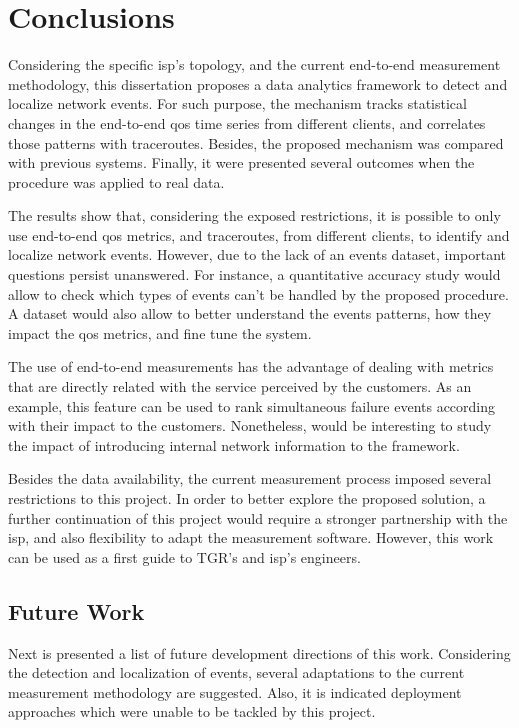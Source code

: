 \chapter{Conclusions}
\label{chap:conclusion}

Considering the specific \gls*{isp}'s topology, and the current end-to-end measurement
methodology, this dissertation proposes a data analytics framework to
detect and localize network events.
For such purpose, the mechanism tracks
statistical changes in the end-to-end \gls*{qos} time series from different clients,
and correlates those patterns with traceroutes.
Besides, the proposed mechanism was compared with previous systems.
Finally, it were presented several outcomes when the procedure was applied to
real data.

The results show that, considering the exposed restrictions,
it is possible to only use end-to-end \gls*{qos} metrics, and traceroutes, from
different clients, to identify and localize network events.
However, due to the lack of an events dataset, important
questions persist unanswered.
For instance, a quantitative accuracy study
would allow to check which types of events can't be handled by the
proposed procedure.
A dataset would also allow to better understand the events
patterns, how they impact the \gls*{qos} metrics, and fine tune the system.

The use of end-to-end measurements has the advantage of dealing with
metrics that are directly related with the service perceived by the customers.
As an example, this feature can be used to rank simultaneous failure events
according with their impact to the customers.
Nonetheless, would be interesting to study the impact of introducing
internal network information to the framework.

Besides the data availability, the current measurement process imposed
several restrictions to this project.
In order to better explore the proposed solution,
a further continuation of this project
would require a stronger partnership with the \gls*{isp},
and also flexibility to adapt the measurement software.
However, this work can be used as a first guide to TGR's and \gls*{isp}'s engineers.

\section{Future Work}

Next is presented a list of future development directions of this work.
Considering the detection and localization of events, several adaptations to
the current measurement methodology are suggested.
Also, it is indicated deployment approaches which
were unable to be tackled by this project.

